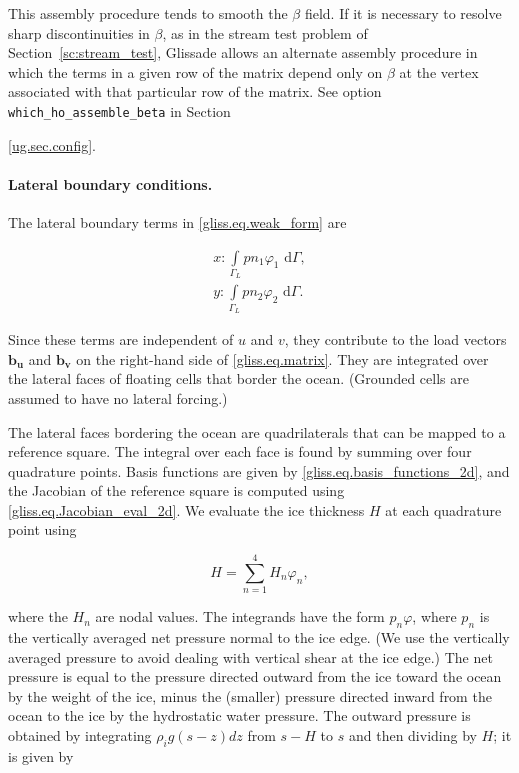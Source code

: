 This assembly procedure tends to smooth the $\beta$ field.  If it is necessary to resolve
sharp discontinuities in $\beta$, as in the stream test problem of Section~\ref{sc:stream_test},
Glissade allows an alternate assembly procedure in which the terms in a given row of the matrix
depend only on $\beta$ at the vertex associated with that particular row of the matrix.
See option \texttt{which\_ho\_assemble\_beta} in Section~{\ref{ug.sec.config}.

\paragraph{Lateral boundary conditions.}

The lateral boundary terms in \eqref{gliss.eq.weak_form} are

\begin{equation}
  \label{gliss.eq.lateral_bc}
  \begin{split}
    x: \int\limits_{{\Gamma }_{L}} {p n_1 {{\varphi }_{1}} \text{ d}\Gamma}, \\
    y: \int\limits_{{\Gamma }_{L}} {p n_2 {{\varphi }_{2}} \text{ d}\Gamma}.
  \end{split}
\end{equation}

\noindent
Since these terms are independent of $u$ and $v$, they contribute to the load vectors
$\mathbf{b_u}$ and $\mathbf{b_v}$ on the right-hand side of \eqref{gliss.eq.matrix}.
They are integrated over the lateral faces of floating cells that border the ocean.
(Grounded cells are assumed to have no lateral forcing.)

The lateral faces bordering the ocean are quadrilaterals that can be mapped to a reference square.
The integral over each face is found by summing over four quadrature points.
Basis functions are given by \eqref{gliss.eq.basis_functions_2d}, and
the Jacobian of the reference square is computed using \eqref{gliss.eq.Jacobian_eval_2d}.
We evaluate the ice thickness $H$ at each quadrature point using

\begin{equation}
  \label{gliss.eq.thickness_qp}
  H = \sum\limits_{n=1}^{4} {H_n \varphi_n},
\end{equation}

\noindent
where the $H_n$ are nodal values.
The integrands have the form $p_n \varphi$, where $p_n$ is the vertically averaged
net pressure normal to the ice edge.  
(We use the vertically averaged pressure to avoid dealing with vertical shear at the ice edge.)
The net pressure is equal to the pressure
directed outward from the ice toward the ocean by the weight of the ice, minus the (smaller)
pressure directed inward from the ocean to the ice by the hydrostatic water pressure.
The outward pressure is obtained by integrating $\rho_i g (s-z) dz$ from $s-H$ to $s$
and then dividing by $H$; it is given by 

}
